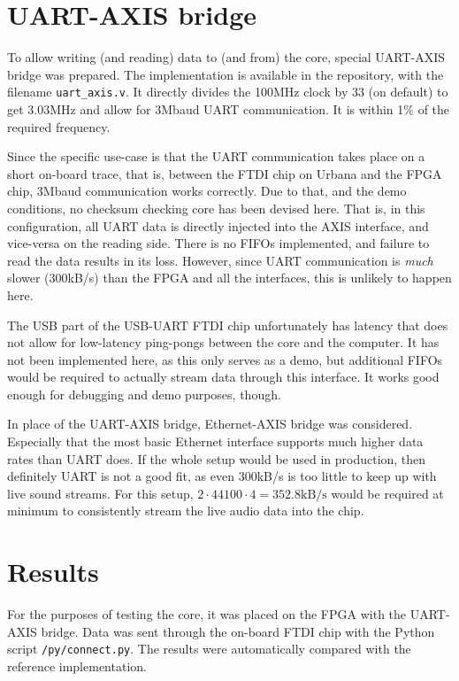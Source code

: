 \documentclass[a4paper,twocolumn]{article}
\begin{document}
\section{UART-AXIS bridge}

To allow writing (and reading) data to (and from) the core, special
UART-AXIS bridge was prepared. The implementation is available in the
repository, with the filename \texttt{uart\_axis.v}. It directly
divides the 100MHz clock by 33 (on default) to get 3.03MHz and
allow for 3Mbaud UART communication. It is within 1\% of the required
frequency.

Since the specific use-case is that the UART communication takes place
on a short on-board trace, that is, between the FTDI chip on Urbana
and the FPGA chip, 3Mbaud communication works correctly. Due to that,
and the demo conditions, no checksum checking core has been devised
here. That is, in this configuration, all UART data is directly
injected into the AXIS interface, and vice-versa on the reading side.
There is no FIFOs implemented, and failure to read the data results in
its loss. However, since UART communication is \emph{much} slower
(300kB/s) than the FPGA and all the interfaces, this is unlikely to
happen here.

The USB part of the USB-UART FTDI chip unfortunately has latency that
does not allow for low-latency ping-pongs between the core and the
computer. It has not been implemented here, as this only serves as a
demo, but additional FIFOs would be required to actually stream data
through this interface. It works good enough for debugging and demo
purposes, though.

In place of the UART-AXIS bridge, Ethernet-AXIS bridge was
considered. Especially that the most basic Ethernet interface supports
much higher data rates than UART does. If the whole setup would be
used in production, then definitely UART is not a good fit, as even
300kB/s is too little to keep up with live sound streams. For this
setup, $2 \cdot 44100 \cdot 4 = 352.8\mathrm{kB/s}$ would be required
at minimum to consistently stream the live audio data into the chip.

\section{Results}

For the purposes of testing the core, it was placed on the FPGA with
the UART-AXIS bridge. Data was sent through the on-board FTDI chip
with the Python script \texttt{/py/connect.py}. The results were
automatically compared with the reference implementation.
\end{document}
